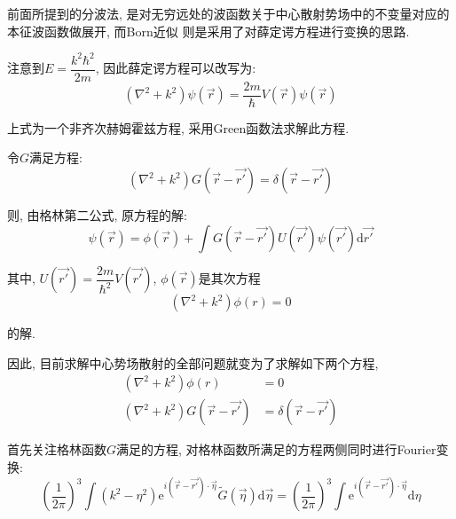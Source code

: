 \documentclass[a4paper, 11pt]{article}
\begin{document}
\begin{spacing}{1.2}
          前面所提到的分波法, 是对无穷远处的波函数关于中心散射势场中的不变量对应的本征波函数做展开, 而Born近似
          则是采用了对薛定谔方程进行变换的思路. 

          注意到$E = \dfrac{k^2\hbar^2}{2m}$, 因此薛定谔方程可以改写为:
          \begin{equation}
            \left(\nabla^2+k^2\right)\psi(\vec{r}) = \dfrac{2m}{\hbar}V(\vec{r})\psi(\vec{r})
          \end{equation}

          上式为一个非齐次赫姆霍兹方程, 采用Green函数法求解此方程. 

          令$G$满足方程:
          \begin{equation}
            \left(\nabla^2+k^2\right)G(\vec{r}-\vec{r'}) = \delta(\vec{r}-\vec{r'})
          \end{equation}

          则, 由格林第二公式, 原方程的解:
          \begin{equation}
            \label{2725:fin}
            \psi(\vec{r}) = \phi(\vec{r}) + \int{}G(\vec{r}-\vec{r'})U(\vec{r'})\psi(\vec{r'})\mathrm{d}\vec{r'}
          \end{equation}

          其中, $U(\vec{r'}) = \dfrac{2m}{\hbar^2}V(\vec{r'})$, $\phi(\vec{r})$是其次方程
          \begin{equation}
            \left(\nabla^2+k^2\right)\phi(r) = 0
          \end{equation}

          的解. 

          因此, 目前求解中心势场散射的全部问题就变为了求解如下两个方程,
          \begin{subequations}
            \begin{align}
              \left(\nabla^2+k^2\right)\phi(r) &= 0\\
              \left(\nabla^2+k^2\right)G(\vec{r}-\vec{r'}) &= \delta(\vec{r}-\vec{r'})
            \end{align}
          \end{subequations}

          首先关注格林函数$G$满足的方程, 对格林函数所满足的方程两侧同时进行Fourier变换:
          \begin{equation}
            \label{fourier_transform_G} 
            \left(\dfrac{1}{2\pi}\right)^3\int(k^2-\eta^2)\mathrm{e}^{i(\vec{r}-\vec{r'})\cdot\vec{\eta}}\tilde{G}(\vec{\eta})%
            \mathrm{d}\vec{\eta} = \left(\dfrac{1}{2\pi}\right)^3\int\mathrm{e}^{i(\vec{r}-\vec{r'})\cdot\vec{\eta}}%
            \mathrm{d}\eta
          \end{equation}


\end{spacing}
\end{document}
